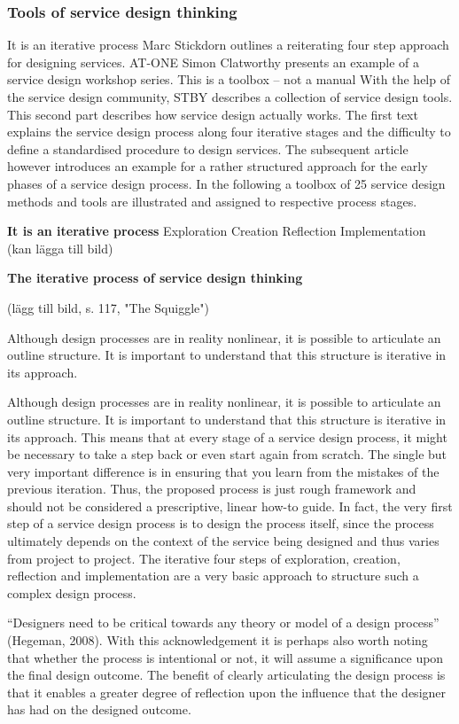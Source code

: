 \subsubsection{Tools of service design thinking}

It is an iterative process
Marc Stickdorn outlines a reiterating four step approach for designing services.
AT-ONE
Simon Clatworthy presents an example of a service design workshop series.
This is a toolbox – not a manual
With the help of the service design community, STBY describes a collection of service design tools.
This second part describes how service design actually works.
The first text explains the service design process along four iterative stages and the difficulty to define a standardised procedure to design services. The subsequent article however introduces an example for a rather structured approach for the early phases of a service design process. In the following a toolbox of 25 service design methods and tools are illustrated and assigned to respective process stages.

\textbf{It is an iterative process}
Exploration
Creation
Reflection
Implementation
(kan lägga till bild)

\textbf{The iterative process of service design thinking}

(lägg till bild, s. 117, "The Squiggle")

Although design processes are in reality nonlinear, it is possible to articulate an outline structure. It is important to understand that this structure is iterative in its approach.

Although design processes are in reality nonlinear, it is possible to articulate an outline structure. It is important to understand that this structure is iterative in its approach.
This means that at every stage of a service design process, it might be necessary to take a step back or even start again from scratch. The single but very important difference is in ensuring that you learn from the mistakes of the previous iteration. Thus, the proposed process is just rough framework and should not be considered a prescriptive, linear how-to guide. In fact, the very first step of a service design process is to design the process itself, since the process ultimately depends on the context of the service being designed and thus varies from project to project.
The iterative four steps of exploration, creation, reflection and implementation are a very basic approach to structure such a complex design process.

“Designers need to be critical towards any theory or model of a design process” (Hegeman, 2008). With this acknowledgement it is perhaps also worth noting that whether the process is intentional or not, it will assume a significance upon the final design outcome. The benefit of clearly articulating the design process is that it enables a greater degree of reflection upon the influence that the designer has had on the designed outcome.

